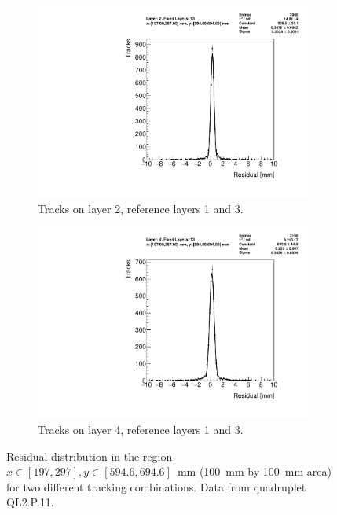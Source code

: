 \begin{figure}
\centering
\begin{subfigure}{.5\textwidth}
  \centering
  \includegraphics[width=\linewidth]{figures/figure_res_dist_QL2P11_3100V_2021-08-05_xbin_12_ybin_7_layer2_fixedlayers13.pdf}
  \caption{Tracks on layer 2, reference layers 1 and 3.}
  \label{fig:res_dist_L2_F13}
\end{subfigure}
\begin{subfigure}{.5\textwidth}
  \centering
  \includegraphics[width=\linewidth]{figures/figure_res_dist_QL2P11_3100V_2021-08-05_xbin_12_ybin_7_layer4_fixedlayers13.pdf}
  \caption{Tracks on layer 4, reference layers 1 and 3.}
  \label{fig:res_dist_L4_F13}
\end{subfigure}
\caption{Residual distribution in the region $x\in\left[197, 297\right],  y\in\left[594.6, 694.6\right]$~mm (\SI{100}{mm} by \SI{100}{mm} area) for two different tracking combinations. Data from quadruplet QL2.P.11.}
\label{fig:res_dist}
\end{figure}

